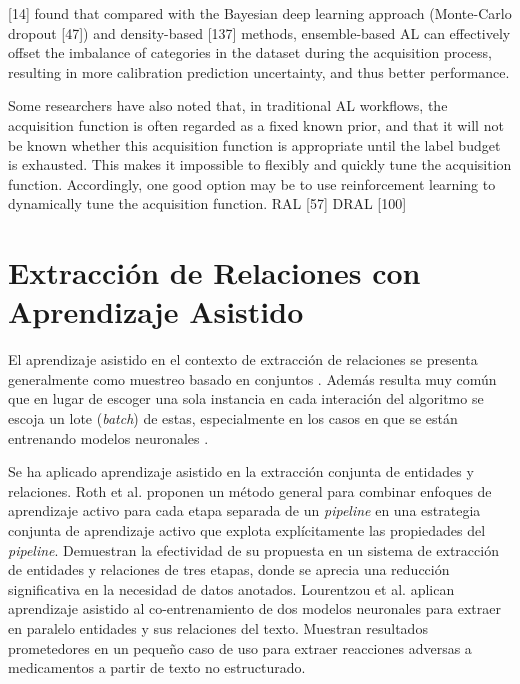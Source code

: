 [14] found that compared with the Bayesian deep learning approach (Monte-Carlo dropout [47]) and density-based [137] methods, ensemble-based AL can
effectively offset the imbalance of categories in the dataset during the acquisition process, resulting
in more calibration prediction uncertainty, and thus better performance.

Some researchers have also noted that, in traditional AL workflows, the acquisition function
is often regarded as a fixed known prior, and that it will not be known whether this acquisition
function is appropriate until the label budget is exhausted. This makes it impossible to flexibly and
quickly tune the acquisition function. Accordingly, one good option may be to use reinforcement
learning to dynamically tune the acquisition function. RAL [57] DRAL [100]


\section{Extracción de Relaciones con Aprendizaje Asistido}

El aprendizaje asistido en el contexto de extracción de relaciones se presenta generalmente como muestreo basado en conjuntos \cite{lourentzou2018mining, zhang2012unified, roth2008pipeline,fu2013efficient}. Además resulta muy común que en lugar de escoger una sola instancia en cada interación del algoritmo se escoja un lote (\textit{batch}) de estas, especialmente en los casos en que se están entrenando modelos neuronales \cite {lourentzou2018difficult,lourentzou2018exploring,lourentzou2018mining}.




Se ha aplicado aprendizaje asistido en la extracción conjunta de entidades y relaciones. 
Roth et al. \cite{ roth2008pipeline} proponen un método general para combinar enfoques de aprendizaje activo para cada etapa separada de un \textit{pipeline} en una estrategia conjunta de aprendizaje activo que explota explícitamente las propiedades del \textit{pipeline}. Demuestran la efectividad de su propuesta en un sistema de extracción de entidades y relaciones de tres etapas, donde se aprecia una reducción significativa en la necesidad de datos anotados. Lourentzou et al. \cite{lourentzou2018difficult} aplican aprendizaje asistido al co-entrenamiento de dos modelos neuronales para extraer en paralelo entidades y sus relaciones del texto. Muestran resultados prometedores en un pequeño caso de uso para extraer reacciones adversas a medicamentos a partir de texto no estructurado. 

